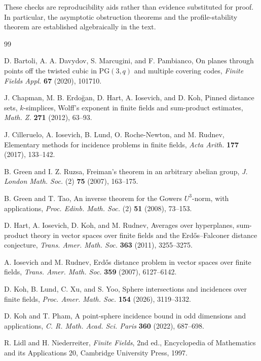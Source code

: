 \documentclass[11pt,letterpaper]{amsart}
\theoremstyle{definition}
\theoremstyle{remark}
\newcommand{\1}{\mathbf 1}
\begin{document}
These checks are reproducibility aids rather than evidence substituted for proof.  In particular, the asymptotic obstruction theorems and the profile-stability theorem are established algebraically in the text.

\begin{thebibliography}{99}

D. Bartoli, A. A. Davydov, S. Marcugini, and F. Pambianco,
On planes through points off the twisted cubic in $\mathrm{PG}(3,q)$ and multiple covering codes,
\emph{Finite Fields Appl.} \textbf{67} (2020), 101710.

J. Chapman, M. B. Erdo\u{g}an, D. Hart, A. Iosevich, and D. Koh,
Pinned distance sets, $k$-simplices, Wolff's exponent in finite fields and sum-product estimates,
\emph{Math. Z.} \textbf{271} (2012), 63--93.

J. Cilleruelo, A. Iosevich, B. Lund, O. Roche-Newton, and M. Rudnev,
Elementary methods for incidence problems in finite fields,
\emph{Acta Arith.} \textbf{177} (2017), 133--142.

B. Green and I. Z. Ruzsa,
Freiman's theorem in an arbitrary abelian group,
\emph{J. London Math. Soc.} (2) \textbf{75} (2007), 163--175.

B. Green and T. Tao,
An inverse theorem for the Gowers $U^3$-norm, with applications,
\emph{Proc. Edinb. Math. Soc.} (2) \textbf{51} (2008), 73--153.

D. Hart, A. Iosevich, D. Koh, and M. Rudnev,
Averages over hyperplanes, sum-product theory in vector spaces over finite fields and the Erd\H{o}s--Falconer distance conjecture,
\emph{Trans. Amer. Math. Soc.} \textbf{363} (2011), 3255--3275.

A. Iosevich and M. Rudnev,
Erd\H{o}s distance problem in vector spaces over finite fields,
\emph{Trans. Amer. Math. Soc.} \textbf{359} (2007), 6127--6142.

D. Koh, B. Lund, C. Xu, and S. Yoo,
Sphere intersections and incidences over finite fields,
\emph{Proc. Amer. Math. Soc.} \textbf{154} (2026), 3119--3132.

D. Koh and T. Pham,
A point-sphere incidence bound in odd dimensions and applications,
\emph{C. R. Math. Acad. Sci. Paris} \textbf{360} (2022), 687--698.

R. Lidl and H. Niederreiter,
\emph{Finite Fields}, 2nd ed., Encyclopedia of Mathematics and its Applications 20,
Cambridge University Press, 1997.


\end{thebibliography}
\end{document}
